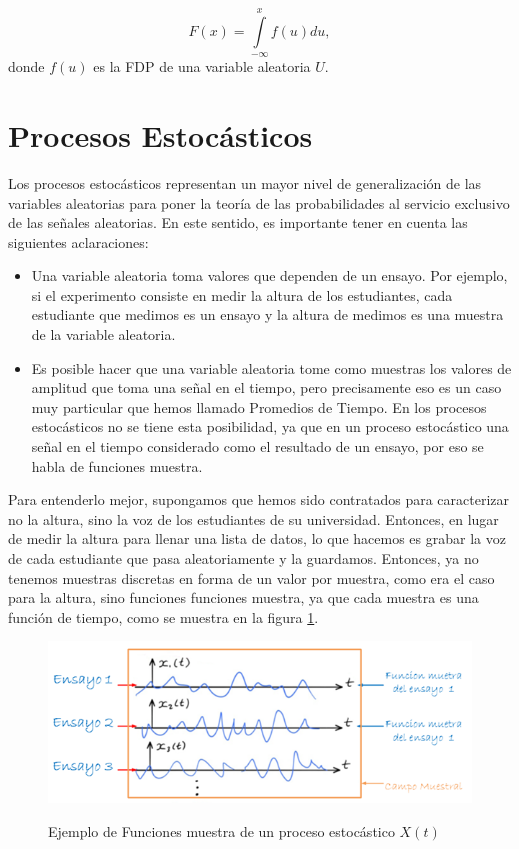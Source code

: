 \begin{equation} \label{equ:fda}
	 F(x)=\int\limits_{-\infty}^{x}  f(u)du,				
\end{equation}
donde $f(u)$ es la FDP de una variable aleatoria $U$.

\section{Procesos Estocásticos}

Los procesos estocásticos representan un mayor nivel de generalización de las variables aleatorias para poner la teoría de las probabilidades al servicio exclusivo de las señales aleatorias. En este sentido, es importante tener en cuenta las siguientes aclaraciones:
\begin{itemize}
    \item Una variable aleatoria toma valores que dependen de un ensayo. Por ejemplo, si el experimento consiste en medir la altura de los estudiantes, cada estudiante que medimos es un ensayo y la altura de medimos es una muestra de la variable aleatoria.
    \item Es posible hacer que una variable aleatoria tome como muestras los valores de amplitud que toma una señal en el tiempo, pero precisamente eso es un caso muy particular que hemos llamado Promedios de Tiempo. En los procesos estocásticos no se tiene esta posibilidad, ya que en un proceso estocástico una señal en el tiempo considerado como el resultado de un ensayo, por eso se habla de funciones muestra.
\end{itemize}

Para entenderlo mejor, supongamos que hemos sido contratados para caracterizar no la altura, sino la voz de los estudiantes de su universidad. Entonces, en lugar de medir la altura para llenar una lista de datos, lo que hacemos es grabar la voz de cada estudiante que pasa aleatoriamente y la guardamos. Entonces, ya no tenemos muestras discretas en forma de un valor por muestra, como era el caso para la altura, sino funciones funciones muestra, ya que cada muestra es una función de tiempo, como se muestra en la figura \ref{fig:Ensayo}.

	\begin{figure}[h!]
		\captionsetup{justification = raggedright, singlelinecheck = false}
		\caption{Ejemplo de Funciones muestra de un proceso estocástico $X(t)$} 
		\centering
		\includegraphics[scale=1]{Imagenes/Ensayo.png}
		\label{fig:Ensayo}
	\end{figure}
	
